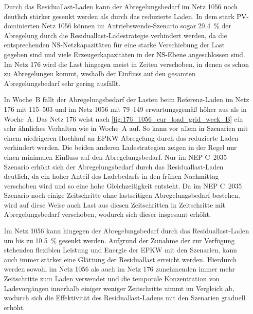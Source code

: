 Durch das Residuallast-Laden kann der Abregelungsbedarf im Netz \num{1056} noch deutlich stärker gesenkt werden als durch das reduzierte Laden.
In dem stark \gls{PV}-dominierten Netz \num{1056} können im Antriebswende-Szenario sogar \SI{29.4}{\percent} der Abregelung durch die Residuallast-Ladestrategie verhindert werden, da die entsprechenden \gls{NS}-Netzkapazitäten für eine starke Verschiebung der Last gegeben sind und viele Erzeugerkapazitäten in der \gls{NS}-Ebene angeschlossen sind.
Im Netz \num{176} wird die Last hingegen meist in Zeiten verschoben, in denen es schon zu Abregelungen kommt, weshalb der Einfluss auf den gesamten Abregelungsbedarf sehr gering ausfällt.



In Woche~B fällt der Abregelungsbedarf der Lasten beim Referenz-Laden im Netz \num{176} mit \SIrange{115}{503}{\mwh} und im Netz \num{1056} mit \SIrange{79}{149}{\mwh} erwartungsgemäß höher aus als in Woche~A.
Das Netz \num{176} weist nach \autoref{fig:176_1056_cur_load_grid_week_B} ein sehr ähnliches Verhalten wie in Woche~A auf.
So kann vor allem in Szenarien mit einem niedrigeren Hochlauf an \gls{EPKW} Abregelung durch das reduzierte Laden verhindert werden.
Die beiden anderen Ladestrategien zeigen in der Regel nur einen minimalen Einfluss auf den Abregelungsbedarf.
Nur im NEP C~\num{2035} Szenario erhöht sich der Abregelungsbedarf durch das Residuallast-Laden deutlich, da ein hoher Anteil des Ladebedarfs in den frühen Nachmittag verschoben wird und so eine hohe Gleichzeitigkeit entsteht.
Da im NEP C~\num{2035} Szenario noch einige Zeitschritte ohne lastseitigen Abregelungsbedarf bestehen, wird auf diese Weise auch Last aus diesen Zeitschritten in Zeitschritte mit Abregelungsbedarf verschoben, wodurch sich dieser insgesamt erhöht.\medskip

Im Netz \num{1056} kann hingegen der Abregelungsbedarf durch das Residuallast-Laden um bis zu \SI{10.5}{\percent} gesenkt werden.
Aufgrund der Zunahme der zur Verfügung stehenden flexiblen Leistung und Energie der \gls{EPKW} mit den Szenarien, kann auch immer stärker eine Glättung der Residuallast erreicht werden.
Hierdurch werden sowohl im Netz \num{1056} als auch im Netz \num{176} zunehmenden immer mehr Zeitschritte zum Laden verwendet und die temporale Konzentration von Ladevorgängen innerhalb einiger weniger Zeitschritte nimmt im Vergleich ab, wodurch sich die Effektivität des Residuallast-Ladens mit den Szenarien graduell erhöht.

